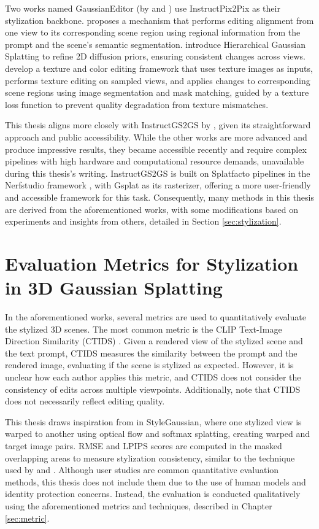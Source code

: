 Two works named GaussianEditor (by \textcite{Wang.2024} and \textcite{Chen.2023a}) use InstructPix2Pix as their stylization backbone. \textcite{Wang.2024} proposes a mechanism that performs editing alignment from one view to its corresponding scene region using regional information from the prompt and the scene's semantic segmentation. \textcite{Chen.2023a} introduce Hierarchical Gaussian Splatting to refine 2D diffusion priors, ensuring consistent changes across views. \textcite{Jaganathan.2024} develop a texture and color editing framework that uses texture images as inputs, performs texture editing on sampled views, and applies changes to corresponding scene regions using image segmentation and mask matching, guided by a texture loss function to prevent quality degradation from texture mismatches.

This thesis aligns more closely with InstructGS2GS by \textcite{Vachha.2024}, given its straightforward approach and public accessibility. While the other works are more advanced and produce impressive results, they became accessible recently and require complex pipelines with high hardware and computational resource demands, unavailable during this thesis's writing. InstructGS2GS is built on Splatfacto pipelines in the Nerfstudio framework \citep{Tancik.2023}, with Gsplat \citep{Ye.2023} as its rasterizer, offering a more user-friendly and accessible framework for this task. Consequently, many methods in this thesis are derived from the aforementioned works, with some modifications based on experiments and insights from others, detailed in Section \ref{sec:stylization}.

\section{Evaluation Metrics for Stylization in 3D Gaussian Splatting}
In the aforementioned works, several metrics are used to quantitatively evaluate the stylized 3D scenes. The most common metric is the CLIP Text-Image Direction Similarity (CTIDS) \citep{Wang.2004, Chen.2024, Chen.2023a, Wu.2024}. Given a rendered view of the stylized scene and the text prompt, CTIDS measures the similarity between the prompt and the rendered image, evaluating if the scene is stylized as expected. However, it is unclear how each author applies this metric, and CTIDS does not consider the consistency of edits across multiple viewpoints. Additionally, \textcite{Wu.2024} note that CTIDS does not necessarily reflect editing quality.

This thesis draws inspiration from \textcite{Liu.2024} in StyleGaussian, where one stylized view is warped to another using optical flow and softmax splatting, creating warped and target image pairs. RMSE and LPIPS scores are computed in the masked overlapping areas to measure stylization consistency, similar to the technique used by \textcite{Mu.2021} and \textcite{Huang.2021}. Although user studies \citep{Jaganathan.2024, Wang.2004, Chen.2024, Chen.2023a, Wu.2024} are common quantitative evaluation methods, this thesis does not include them due to the use of human models and identity protection concerns. Instead, the evaluation is conducted qualitatively using the aforementioned metrics and techniques, described in Chapter \ref{sec:metric}.
